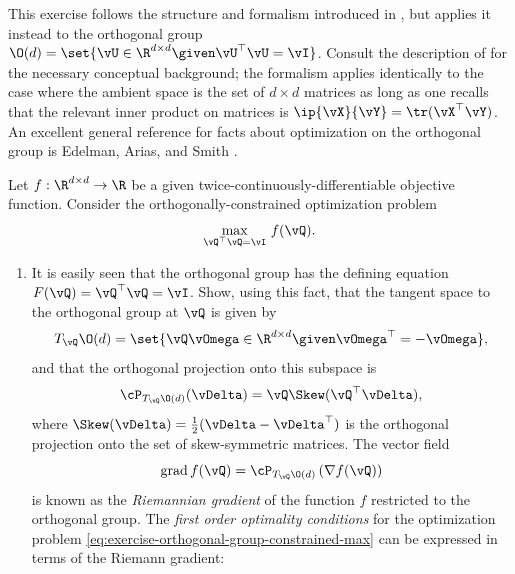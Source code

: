 \documentclass[../../book-main.tex]{subfiles}
\begin{document}
\begin{exercise}\label{exercise:orthogonal-group-calculus}
    This exercise follows the structure and formalism introduced in , but applies it instead to the orthogonal group $\O(d) = \set{\vU \in \R^{d \times d} \given \vU^\top \vU = \vI}$. 
    Consult the description of  for the necessary conceptual background; the formalism applies identically to the case where the ambient space is the set of $d \times d$ matrices as long as one recalls that the relevant inner product on matrices is $\ip{\vX}{\vY} = \tr(\vX^\top \vY)$.
    An excellent general reference for facts about optimization on the orthogonal group is Edelman, Arias, and Smith \cite{Edelman1998-lg}.
    
    Let $f : \R^{d\times d} \to \R$ be a given twice-continuously-differentiable objective function. Consider the orthogonally-constrained optimization problem
    \begin{equation}\label{eq:exercise-orthogonal-group-constrained-max}
        \max_{\vQ^\top \vQ = \vI}\, f(\vQ). 
    \end{equation}
    \begin{enumerate}
        \item  It is easily seen that the orthogonal group has the defining equation $F(\vQ) = \vQ^\top \vQ = \vI$.
        Show, using this fact, that the tangent space to the orthogonal group at $\vQ$ is given by
        \begin{equation*}
            T_{\vQ} \O(d) = \set{\vQ \vOmega \in \R^{d\times d} \given \vOmega^\top = - \vOmega},
        \end{equation*}
        and that the orthogonal projection onto this subspace is 
        \begin{equation*}
        \cP_{T_{\vQ}\O(d)}(\vDelta) =  \vQ \Skew(\vQ^\top \vDelta),
        \end{equation*}
        where $\Skew(\vDelta) = \tfrac{1}{2} ( \vDelta - \vDelta^\top)$ is the orthogonal projection onto the set of skew-symmetric matrices.
        The vector field 
        \begin{equation}\label{eq:exercise-riemann-grad-orthogonal-group}
        \mathrm{grad}\, f(\vQ) = \cP_{T_{\vQ} \O(d)} \left( \nabla f(\vQ) \right)
        \end{equation}
        is known as the \textit{Riemannian gradient} of the function $f$ restricted to the orthogonal group.
        The \textit{first order optimality conditions} for the optimization problem \eqref{eq:exercise-orthogonal-group-constrained-max} can be expressed in terms of the Riemann gradient:

\end{enumerate}
\end{exercise}
\end{document}
